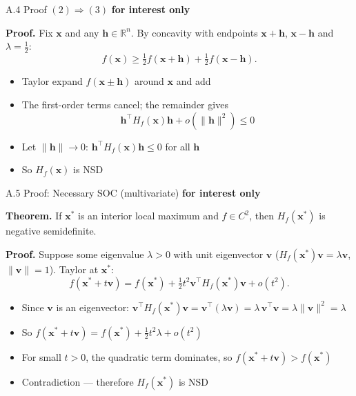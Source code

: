 \documentclass[11pt,aspectratio=169]{beamer}
\newcommand{\InterestOnly}{\textcolor{mAccent}{\textbf{for interest only}}}
\begin{document}
\begin{frame}{A.4 Proof $(2) \Rightarrow (3)$}
  \small
  \InterestOnly
  
  \textbf{Proof.} Fix $\mathbf{x}$ and any $\mathbf{h} \in \mathbb{R}^n$. By concavity with endpoints $\mathbf{x}+\mathbf{h}$, $\mathbf{x}-\mathbf{h}$ and $\lambda=\tfrac12$:
  \[
    f(\mathbf{x}) \geq \tfrac12 f(\mathbf{x}+\mathbf{h}) + \tfrac12 f(\mathbf{x}-\mathbf{h}).
  \]
  
  \begin{itemize}
    \item Taylor expand $f(\mathbf{x}\pm\mathbf{h})$ around $\mathbf{x}$ and add
    
    \item The first-order terms cancel; the remainder gives
    \[
      \mathbf{h}^\top H_f(\mathbf{x})\mathbf{h} + o(\|\mathbf{h}\|^2) \leq 0
    \]
    
    \item Let $\|\mathbf{h}\| \to 0$: $\mathbf{h}^\top H_f(\mathbf{x})\mathbf{h} \leq 0$ for all $\mathbf{h}$
    
    \item So $H_f(\mathbf{x})$ is NSD
  \end{itemize}
\end{frame}

\hypertarget{appendix:multivariate_soc}{}
\begin{frame}{A.5 Proof: Necessary SOC (multivariate)}
  \small
  \InterestOnly
  
  \textbf{Theorem.} If $\mathbf{x}^*$ is an interior local maximum and $f \in C^2$, then $H_f(\mathbf{x}^*)$ is negative semidefinite.
  
  \textbf{Proof.} Suppose some eigenvalue $\lambda > 0$ with unit eigenvector $\mathbf{v}$ ($H_f(\mathbf{x}^*)\mathbf{v}=\lambda\mathbf{v}$, $\|\mathbf{v}\|=1$). Taylor at $\mathbf{x}^*$:
  \[
    f(\mathbf{x}^* + t\mathbf{v})
    =
    f(\mathbf{x}^*) + \tfrac12 t^2 \mathbf{v}^\top H_f(\mathbf{x}^*)\mathbf{v} + o(t^2).
  \]
  
  \begin{itemize}
    \item Since $\mathbf{v}$ is an eigenvector: $\mathbf{v}^\top H_f(\mathbf{x}^*)\mathbf{v}
    = \mathbf{v}^\top(\lambda\mathbf{v}) = \lambda\,\mathbf{v}^\top\mathbf{v} = \lambda\|\mathbf{v}\|^2 = \lambda$
    
    \item So $f(\mathbf{x}^* + t\mathbf{v}) = f(\mathbf{x}^*) + \tfrac12 t^2 \lambda + o(t^2)$
    
    \item For small $t > 0$, the quadratic term dominates, so $f(\mathbf{x}^* + t\mathbf{v}) > f(\mathbf{x}^*)$
    
    \item Contradiction --- therefore $H_f(\mathbf{x}^*)$ is NSD
  \end{itemize}
\end{frame}
\end{document}
